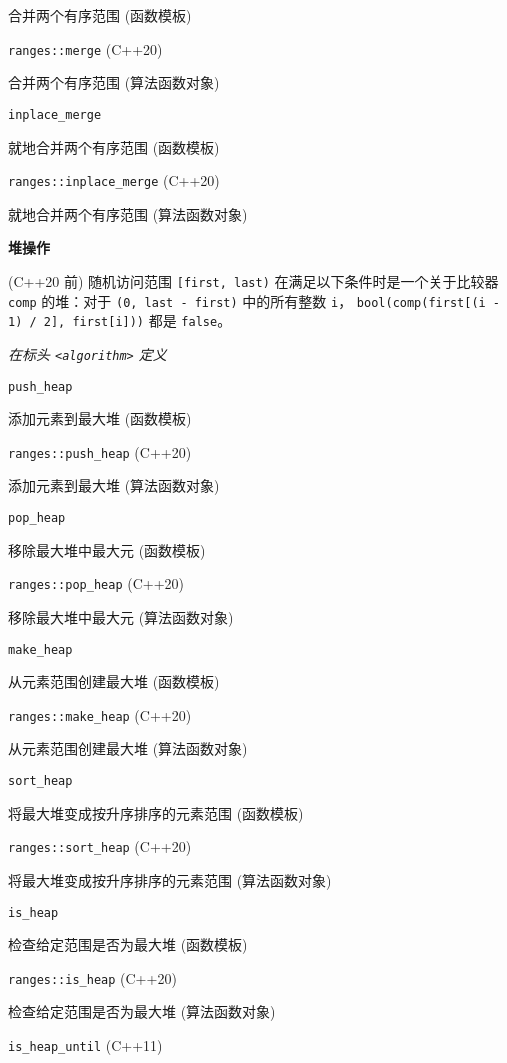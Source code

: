 合并两个有序范围 (函数模板)

\noindent \lstinline{ranges::merge} (C++20)

合并两个有序范围 (算法函数对象)

\noindent \lstinline{inplace_merge}

就地合并两个有序范围 (函数模板)

\noindent \lstinline{ranges::inplace_merge} (C++20)

就地合并两个有序范围 (算法函数对象)

\noindent \textbf{堆操作}

(C++20 前) 随机访问范围 \lstinline{[first, last)} 在满⾜以下条件时是⼀个关于⽐较器 \lstinline{comp} 的堆：对于 \lstinline{(0, last - first)} 中的所有整数 \lstinline{i}， \lstinline{bool(comp(first[(i - 1) / 2], first[i]))} 都是 \lstinline{false}。

\textit{在标头 \lstinline{<algorithm>} 定义}


\noindent \lstinline{push_heap}

添加元素到最⼤堆 (函数模板)

\noindent \lstinline{ranges::push_heap} (C++20)

添加元素到最⼤堆 (算法函数对象)

\noindent \lstinline{pop_heap}

移除最⼤堆中最⼤元 (函数模板)

\noindent \lstinline{ranges::pop_heap} (C++20)

移除最⼤堆中最⼤元 (算法函数对象)

\noindent \lstinline{make_heap}

从元素范围创建最⼤堆 (函数模板)

\noindent \lstinline{ranges::make_heap} (C++20)

从元素范围创建最⼤堆 (算法函数对象)

\noindent \lstinline{sort_heap}

将最⼤堆变成按升序排序的元素范围 (函数模板)

\noindent \lstinline{ranges::sort_heap} (C++20)

将最⼤堆变成按升序排序的元素范围 (算法函数对象)

\noindent \lstinline{is_heap}

检查给定范围是否为最⼤堆 (函数模板)

\noindent \lstinline{ranges::is_heap} (C++20)

检查给定范围是否为最⼤堆 (算法函数对象)

\noindent \lstinline{is_heap_until} (C++11)

